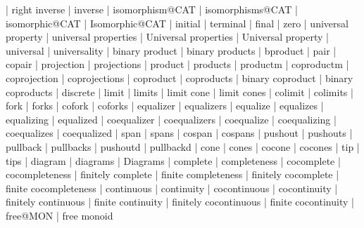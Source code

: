     |   right inverse
    |   inverse
    |   isomorphism@CAT
    |   isomorphisms@CAT
    |   isomorphic@CAT
    |   Isomorphic@CAT
    |   initial
    |   terminal
    |   final
    |   zero
    |   universal property
    |   universal properties
    |   Universal properties
    |   Universal property
    |   universal
    |   universality
    |   binary product
    |   binary products
    |   bproduct
    |   pair
    |   copair
    |   projection
    |   projections
    |   product
    |   products
    |   productm
    |   coproductm
    |   coprojection
    |   coprojections
    |   coproduct
    |   coproducts
    |   binary coproduct
    |   binary coproducts
    |   discrete
    |   limit
    |   limits
    |   limit cone
    |   limit cones
    |   colimit
    |   colimits
    |   fork
    |   forks
    |   cofork
    |   coforks
    |   equalizer
    |   equalizers
    |   equalize
    |   equalizes
    |   equalizing
    |   equalized
    |   coequalizer
    |   coequalizers
    |   coequalize
    |   coequalizing
    |   coequalizes
    |   coequalized
    |   span
    |   spans
    |   cospan
    |   cospans
    |   pushout
    |   pushouts
    |   pullback
    |   pullbacks
    |   pushoutd
    |   pullbackd
    |   cone
    |   cones
    |   cocone
    |   cocones
    |   tip
    |   tips
    |   diagram
    |   diagrams
    |   Diagrams
    |   complete
    |   completeness
    |   cocomplete
    |   cocompleteness
    |   finitely complete
    |   finite completeness
    |   finitely cocomplete
    |   finite cocompleteness
    |   continuous
    |   continuity
    |   cocontinuous
    |   cocontinuity
    |   finitely continuous
    |   finite continuity
    |   finitely cocontinuous
    |   finite cocontinuity
    |   free@MON
    |   free monoid
